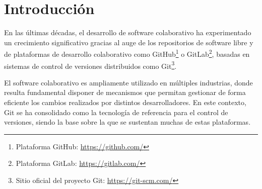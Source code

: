 \documentclass[a4paper, 12pt]{book}
\begin{document}


\tableofcontents 
\cleardoublepage
\listoffigures %
\cleardoublepage
\listoftables %



\cleardoublepage
\chapter{Introducción}
\label{sec:intro} %

En las últimas décadas, el desarrollo de software colaborativo ha experimentado un crecimiento significativo gracias al auge de los repositorios de software libre y de plataformas de desarrollo colaborativo como GitHub\footnote{Plataforma GitHub: \url{https://github.com/}} o GitLab\footnote{Plataforma GitLab: \url{https://gitlab.com/}}, basadas en sistemas de control de versiones distribuidos como Git\footnote{Sitio oficial del proyecto Git: \url{https://git-scm.com/}}. 

El software colaborativo es ampliamente utilizado en múltiples industrias, donde resulta fundamental disponer de mecanismos que permitan gestionar de forma eficiente los cambios realizados por distintos desarrolladores. En este contexto, Git se ha consolidado como la tecnología de referencia para el control de versiones, siendo la base sobre la que se sustentan muchas de estas plataformas.
\end{document}
